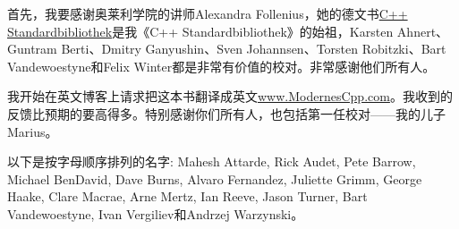 首先，我要感谢奥莱利学院的讲师Alexandra Follenius，她的德文书\href{http://shop.oreilly.com/product/9783955619688.do}{C++ Standardbibliothek}是我《C++ Standardbibliothek》的始祖，Karsten Ahnert、Guntram Berti、Dmitry Ganyushin、Sven Johannsen、Torsten Robitzki、Bart Vandewoestyne和Felix Winter都是非常有价值的校对。非常感谢他们所有人。

我开始在英文博客上请求把这本书翻译成英文\href{http://www.modernescpp.com/index.php/do-you-wan-t-to-proofread-a-book}{www.ModernesCpp.com}。我收到的反馈比预期的要高得多。特别感谢你们所有人，也包括第一任校对——我的儿子Marius。

以下是按字母顺序排列的名字: Mahesh Attarde, Rick Audet, Pete Barrow, Michael BenDavid, Dave Burns, Alvaro Fernandez, Juliette Grimm, George Haake, Clare Macrae, Arne Mertz, Ian Reeve, Jason Turner, Bart Vandewoestyne, Ivan Vergiliev和Andrzej Warzynski。